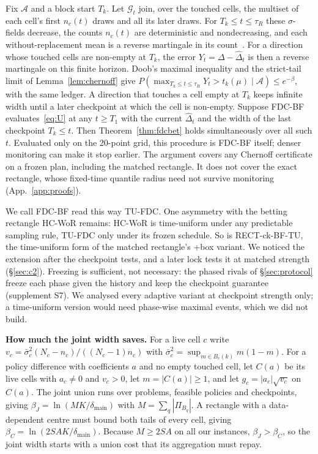 \documentclass[sigconf,anonymous,review]{acmart}
\newcommand{\cA}{\mathcal{A}}
\newcommand{\dmain}{\delta_{\text{main}}}
\begin{document}
\begin{remark}\label{rem:tu}
Fix $\cA$ and a block start $T_k$. Let $\mathcal{G}_t$ join, over the touched cells, the multiset of each cell's first $n_c(t)$ draws and all its later draws. For $T_k \le t \le \tau_R$ these $\sigma$-fields decrease, the counts $n_c(t)$ are deterministic and nondecreasing, and each without-replacement mean is a reverse martingale in its count~\citep{serfling1974probability,bardenet2015concentration}. For a direction whose touched cells are non-empty at $T_k$, the error $Y_t = \Delta - \hat\Delta_t$ is then a reverse martingale on this finite horizon. Doob's maximal inequality and the strict-tail limit of Lemma~\ref{lem:chernoff} give $P(\max_{T_k \le t \le \tau_R} Y_t > t_k(\mu) \mid \cA) \le e^{-\beta}$, with the same ledger. A direction that touches a cell empty at $T_k$ keeps infinite width until a later checkpoint at which the cell is non-empty. Suppose FDC-BF evaluates~\eqref{eq:U} at any $t \ge T_1$ with the current $\hat\Delta_t$ and the width of the last checkpoint $T_k \le t$. Then Theorem~\ref{thm:fdcbet} holds simultaneously over all such $t$. Evaluated only on the 20-point grid, this procedure is FDC-BF itself; denser monitoring can make it stop earlier. The argument covers any Chernoff certificate on a frozen plan, including the matched rectangle. It does not cover the exact rectangle, whose fixed-time quantile radius need not survive monitoring (App.~\ref{app:proofs}).
\end{remark}

We call FDC-BF read this way TU-FDC. One asymmetry with the betting rectangle HC-WoR remains: HC-WoR is time-uniform under any predictable sampling rule, TU-FDC only under its frozen schedule. So is RECT-ck-BF-TU, the time-uniform form of the matched rectangle's +box variant. We noticed the extension after the checkpoint tests, and a later lock tests it at matched strength (\S\ref{sec:c2}). Freezing is sufficient, not necessary: the phased rivals of \S\ref{sec:protocol} freeze each phase given the history and keep the checkpoint guarantee (supplement S7). We analysed every adaptive variant at checkpoint strength only; a time-uniform version would need phase-wise maximal events, which we did not build.

\textbf{How much the joint width saves.} For a live cell $c$ write $v_c = \bar\sigma_c^2 (N_c - n_c)/((N_c - 1)n_c)$ with $\bar\sigma_c^2 = \sup_{m \in B_c(k)} m(1-m)$. For a policy difference with coefficients $a$ and no empty touched cell, let $C(a)$ be its live cells with $a_c \ne 0$ and $v_c > 0$, let $m = |C(a)| \ge 1$, and let $g_c = |a_c|\sqrt{v_c}$ on $C(a)$. The joint union runs over problems, feasible policies and checkpoints, giving $\beta_J = \ln(MK/\dmain)$ with $M = \sum_q |\Pi_{B_q}|$. A rectangle with a data-dependent centre must bound both tails of every cell, giving $\beta_C = \ln(2SAK/\dmain)$. Because $M \ge 2SA$ on all our instances, $\beta_J > \beta_C$, so the joint width starts with a union cost that its aggregation must repay.
\end{document}
